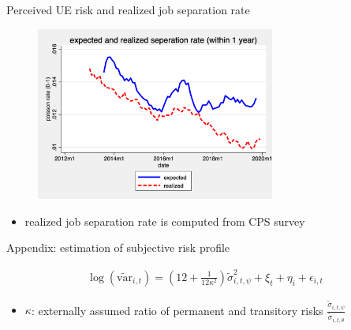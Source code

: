 \documentclass{beamer}
\begin{document}
\begin{frame}{Perceived UE risk and realized job separation rate}
	\begin{figure}
		\centering
		\label{ue_expectations}
		\includegraphics[width=0.7\textwidth]{figures/seperation_rate_1y}
	\end{figure}
	\begin{itemize}
		\item realized job separation rate is computed from CPS survey 
	\end{itemize}
\end{frame}


\begin{frame}{Appendix: estimation of subjective risk profile}
	\label{appendix:RegimeEstimationDetail}
	
	\begin{equation*}
		\begin{split}
				\log(\tilde {\text{var}}_{i,t})= (12+\frac{1}{12\kappa^2})\tilde \sigma^2_{i,t,\psi} + \xi_{t}+\eta_{i}+ \epsilon_{i,t}
			\end{split}
	\end{equation*}
	\begin{itemize}
		
		\item $\kappa$: externally assumed ratio of permanent and transitory risks $\frac{\tilde \sigma_{i,t,\psi}}{\tilde \sigma_{i,t,\theta}}$
		\end{itemize}
	\hyperlink{RegimeEstimation}{} 
\end{frame}
\end{document}
